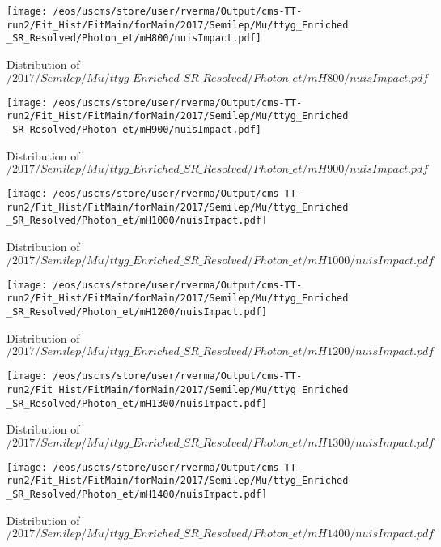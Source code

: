 \begin{figure}
\centering
\texttt{[image: /eos/uscms/store/user/rverma/Output/cms-TT-run2/Fit\_Hist/FitMain/forMain/2017/Semilep/Mu/ttyg\_Enriched\_SR\_Resolved/Photon\_et/mH800/nuisImpact.pdf]}
\caption{Distribution of $/2017/Semilep/Mu/ttyg\_Enriched\_SR\_Resolved/Photon\_et/mH800/nuisImpact.pdf$}
\end{figure}

\begin{figure}
\centering
\texttt{[image: /eos/uscms/store/user/rverma/Output/cms-TT-run2/Fit\_Hist/FitMain/forMain/2017/Semilep/Mu/ttyg\_Enriched\_SR\_Resolved/Photon\_et/mH900/nuisImpact.pdf]}
\caption{Distribution of $/2017/Semilep/Mu/ttyg\_Enriched\_SR\_Resolved/Photon\_et/mH900/nuisImpact.pdf$}
\end{figure}

\begin{figure}
\centering
\texttt{[image: /eos/uscms/store/user/rverma/Output/cms-TT-run2/Fit\_Hist/FitMain/forMain/2017/Semilep/Mu/ttyg\_Enriched\_SR\_Resolved/Photon\_et/mH1000/nuisImpact.pdf]}
\caption{Distribution of $/2017/Semilep/Mu/ttyg\_Enriched\_SR\_Resolved/Photon\_et/mH1000/nuisImpact.pdf$}
\end{figure}

\begin{figure}
\centering
\texttt{[image: /eos/uscms/store/user/rverma/Output/cms-TT-run2/Fit\_Hist/FitMain/forMain/2017/Semilep/Mu/ttyg\_Enriched\_SR\_Resolved/Photon\_et/mH1200/nuisImpact.pdf]}
\caption{Distribution of $/2017/Semilep/Mu/ttyg\_Enriched\_SR\_Resolved/Photon\_et/mH1200/nuisImpact.pdf$}
\end{figure}

\begin{figure}
\centering
\texttt{[image: /eos/uscms/store/user/rverma/Output/cms-TT-run2/Fit\_Hist/FitMain/forMain/2017/Semilep/Mu/ttyg\_Enriched\_SR\_Resolved/Photon\_et/mH1300/nuisImpact.pdf]}
\caption{Distribution of $/2017/Semilep/Mu/ttyg\_Enriched\_SR\_Resolved/Photon\_et/mH1300/nuisImpact.pdf$}
\end{figure}

\begin{figure}
\centering
\texttt{[image: /eos/uscms/store/user/rverma/Output/cms-TT-run2/Fit\_Hist/FitMain/forMain/2017/Semilep/Mu/ttyg\_Enriched\_SR\_Resolved/Photon\_et/mH1400/nuisImpact.pdf]}
\caption{Distribution of $/2017/Semilep/Mu/ttyg\_Enriched\_SR\_Resolved/Photon\_et/mH1400/nuisImpact.pdf$}
\end{figure}

